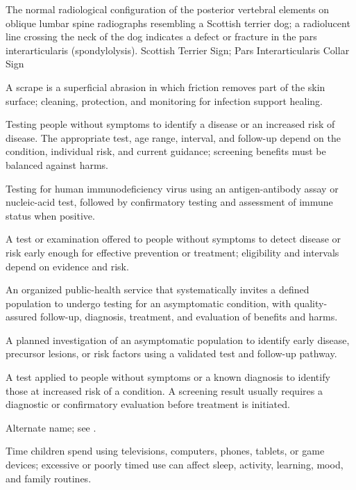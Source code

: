  The normal radiological configuration of the posterior vertebral elements on oblique lumbar spine radiographs resembling a Scottish terrier dog; a radiolucent line crossing the neck of the dog indicates a defect or fracture in the pars interarticularis (spondylolysis).
\synonyms
Scottish Terrier Sign; Pars Interarticularis Collar Sign

 A scrape is a superficial abrasion in which friction removes part of the skin surface; cleaning, protection, and monitoring for infection support healing.

 Testing people without symptoms to identify a disease or an increased risk of disease. The appropriate test,
age range, interval, and follow-up depend on the condition, individual risk, and current
guidance; screening benefits must be balanced against harms.

 Testing for human immunodeficiency virus using an antigen-antibody assay or nucleic-acid test, followed by confirmatory testing and assessment of immune status when positive.

 A test or examination offered to people without symptoms to detect disease or risk early enough for effective prevention or treatment; eligibility and intervals depend on evidence and risk.

 An organized public-health service that systematically invites a defined population to
undergo testing for an asymptomatic condition, with quality-assured follow-up,
diagnosis, treatment, and evaluation of benefits and harms.

 A planned investigation of an asymptomatic population to identify early disease, precursor lesions, or risk factors using a validated test and follow-up pathway.

 A test applied to people without symptoms or a known diagnosis to identify those at
increased risk of a condition. A screening result usually requires a diagnostic or
confirmatory evaluation before treatment is initiated.

 Alternate name; see .

 Time children spend using televisions, computers, phones, tablets, or game devices; excessive or poorly timed use can affect sleep, activity, learning, mood, and family routines.


